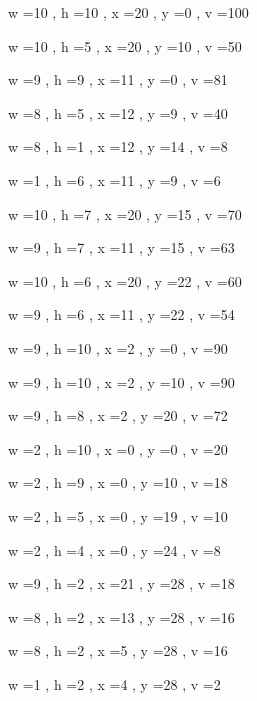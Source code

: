 \documentclass[11pt]{article}
\begin{document}
w =10 , h =10 , x =20 , y =0 , v =100
\par
w =10 , h =5 , x =20 , y =10 , v =50
\par
w =9 , h =9 , x =11 , y =0 , v =81
\par
w =8 , h =5 , x =12 , y =9 , v =40
\par
w =8 , h =1 , x =12 , y =14 , v =8
\par
w =1 , h =6 , x =11 , y =9 , v =6
\par
w =10 , h =7 , x =20 , y =15 , v =70
\par
w =9 , h =7 , x =11 , y =15 , v =63
\par
w =10 , h =6 , x =20 , y =22 , v =60
\par
w =9 , h =6 , x =11 , y =22 , v =54
\par
w =9 , h =10 , x =2 , y =0 , v =90
\par
w =9 , h =10 , x =2 , y =10 , v =90
\par
w =9 , h =8 , x =2 , y =20 , v =72
\par
w =2 , h =10 , x =0 , y =0 , v =20
\par
w =2 , h =9 , x =0 , y =10 , v =18
\par
w =2 , h =5 , x =0 , y =19 , v =10
\par
w =2 , h =4 , x =0 , y =24 , v =8
\par
w =9 , h =2 , x =21 , y =28 , v =18
\par
w =8 , h =2 , x =13 , y =28 , v =16
\par
w =8 , h =2 , x =5 , y =28 , v =16
\par
w =1 , h =2 , x =4 , y =28 , v =2
\par
\newpage


\end{document}
